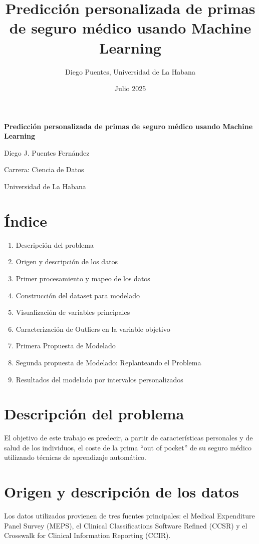 \documentclass[12pt,a4paper]{article}
\title{Predicción personalizada de primas de seguro médico usando Machine Learning}
\author{Diego Puentes, Universidad de La Habana}
\date{Julio 2025}
\begin{document}
\begin{titlepage}

    \centering
    {\Huge\bfseries Predicción personalizada de primas de seguro médico usando Machine Learning \par}
    \vspace{2cm}
    {\Large Diego J. Puentes Fernández \par}
    {\large Carrera: Ciencia de Datos \par}
    {\large Universidad de La Habana \par}
    \vfill
\end{titlepage}


\newpage
\section*{Índice}
\begin{enumerate}[leftmargin=2cm]
    \item Descripción del problema
    \item Origen y descripción de los datos
    \item Primer procesamiento y mapeo de los datos
    \item Construcción del dataset para modelado
    \item Visualización de variables principales
    \item Caracterización de Outliers en la variable objetivo
    \item Primera Propuesta de Modelado
    \item Segunda propuesta de Modelado: Replanteando el Problema
    \item Resultados del modelado por intervalos personalizados
\end{enumerate}
\newpage

\maketitle

\section*{Descripción del problema}
El objetivo de este trabajo es predecir, a partir de características personales y de salud de los individuos, el coste de la prima ``out of pocket'' de su seguro médico utilizando técnicas de aprendizaje automático.

\section*{Origen y descripción de los datos}
Los datos utilizados provienen de tres fuentes principales: el Medical Expenditure Panel Survey (MEPS), el Clinical Classifications Software Refined (CCSR) y el Crosswalk for Clinical Information Reporting (CCIR).
\end{document}
